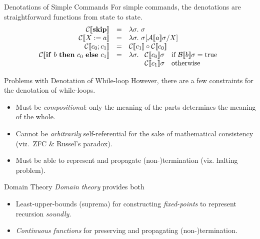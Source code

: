 \begin{frame}{Denotations of Simple Commands}
    For simple commands, the denotations are straightforward functions from state to state.
    \[\begin{array}{rcl}
        \denC{\mathbf{skip}} & = & \lambda \sigma.\ \sigma \\
        \denC{X := a} & = & \lambda \sigma.\ \sigma[\denA{a}\sigma/X] \\
        \denC{c_0; c_1} & = & \denC{c_1} \circ \denC{c_0} \\
        \denC{\mathbf{if}\ b\ \mathbf{then}\ c_0\ \mathbf{else}\ c_1} & = &
            \lambda \sigma.\ \begin{array}[t]{ll}
                \denC{c_0}\sigma & \text{if } \denB{b}\sigma = \mathrm{true} \\
                \denC{c_1}\sigma & \text{otherwise}
            \end{array}
    \end{array}\]
\end{frame}

\begin{frame}{Problems with Denotation of While-loop}
    However, there are a few constraints for the denotation of while-loops.
    \pause
    \begin{itemize}[<+->]
        \item Must be \emph{compositional}: only the meaning of the parts
            determines the meaning of the whole.
        \item Cannot be \emph{arbitrarily} self-referential for the
            sake of mathematical consistency (viz.~ZFC \& Russel's paradox).
        \item Must be able to represent and propagate (non-)termination (viz.
            halting problem).
    \end{itemize}
\end{frame}

\begin{frame}{Domain Theory}
    \emph{Domain theory} provides both
    \pause
    \begin{itemize}[<+->]
        \item Least-upper-bounds (suprema) for constructing \emph{fixed-points} to represent recursion \emph{soundly}.
        \item \emph{Continuous functions} for preserving and propagating (non-)termination.
    \end{itemize}
\end{frame}

